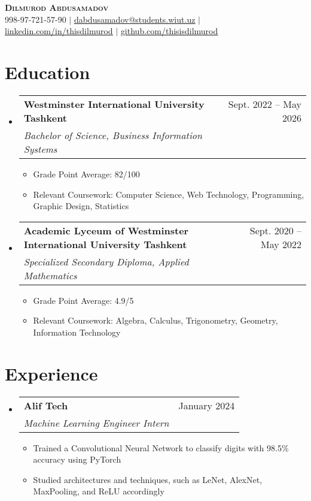 \documentclass[letterpaper,11pt]{article}
\makeatletter
\newcommand{\resumeItem}[1]{
  \item\small{
    {#1 \vspace{-2pt}}
  }
}
\newcommand{\resumeSubheading}[4]{
  \vspace{-2pt}\item
    \begin{tabular*}{0.97\textwidth}[t]{l@{\extracolsep{\fill}}r}
      \textbf{#1} & #2 \\
      \textit{\small#3} & \textit{\small #4} \\
    \end{tabular*}\vspace{-7pt}
}
\newcommand{\resumeSubHeadingListStart}{\begin{itemize}[leftmargin=0.15in, label={}]}
\newcommand{\resumeSubHeadingListEnd}{\end{itemize}}
\newcommand{\resumeItemListStart}{\begin{itemize}}
\newcommand{\resumeItemListEnd}{\end{itemize}\vspace{-5pt}}
\makeatother
\begin{document}
\begin{center}
    \textbf{\Huge \scshape Dilmurod Abdusamadov} \\ \vspace{1pt}
    \small 998-97-721-57-90 $|$ \href{mailto:dabdusamadov@students.wiut.uz}{\underline{dabdusamadov@students.wiut.uz}} $|$ 
    \href{https://linkedin.com/in/thisisdilmurod}{\underline{linkedin.com/in/thisdilmurod}} $|$
    \href{https://github.com/thisisdilmurod}{\underline{github.com/thisisdilmurod}}
\end{center}

\section{Education}
  \resumeSubHeadingListStart
    \resumeSubheading
      {Westminster International University Tashkent}{Sept. 2022 -- May 2026}
      {Bachelor of Science, Business Information Systems}{}
      \resumeItemListStart
        \resumeItem{Grade Point Average: 82/100}
        \resumeItem{Relevant Coursework: Computer Science, Web Technology, Programming, Graphic Design, Statistics}
      \resumeItemListEnd
    \resumeSubheading
      {Academic Lyceum of Westminster International University Tashkent}{Sept. 2020 -- May 2022}
      {Specialized Secondary Diploma, Applied Mathematics}{}
      \resumeItemListStart
        \resumeItem{Grade Point Average: 4.9/5}
        \resumeItem{Relevant Coursework: Algebra, Calculus, Trigonometry, Geometry, Information Technology}
      \resumeItemListEnd
  \resumeSubHeadingListEnd

\section{Experience}
  \resumeSubHeadingListStart

    \resumeSubheading
      {Alif Tech}{January 2024}
      {Machine Learning Engineer Intern}{}
      \resumeItemListStart
        \resumeItem{Trained a Convolutional Neural Network to classify digits with 98.5\% accuracy using PyTorch }
        \resumeItem{Studied architectures and techniques, such as LeNet, AlexNet, MaxPooling, and ReLU accordingly}
      \resumeItemListEnd

  \resumeSubHeadingListEnd

\end{document}
